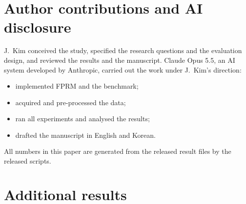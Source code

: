 \documentclass[11pt,a4paper]{article}
\newcommand{\tabdir}{../tables/en}
\begin{document}
\section*{Author contributions and AI disclosure}
J.\ Kim conceived the study, specified the research questions and the evaluation design, and reviewed the results and the manuscript.
Claude Opus 5.5, an AI system developed by Anthropic, carried out the work under J.\ Kim's direction:
\begin{itemize}
  \item implemented FPRM and the benchmark;
  \item acquired and pre-processed the data;
  \item ran all experiments and analysed the results;
  \item drafted the manuscript in English and Korean.
\end{itemize}
All numbers in this paper are generated from the released result files by the released scripts.




\clearpage
\appendix
\section{Additional results}

\begin{table}[h]
  \centering\small
  \caption{Median absolute error of total energy over removed daytime periods (\% of true energy). Bold: best per column.}
  \label{tab:energy}
  
\end{table}

\begin{table}[h]
  \centering\small
  \caption{Mean rank by dataset (all scenarios). Bold: best per column.}
  \label{tab:rank_ds}
  
\end{table}

\begin{table}[p]
  \centering\scriptsize
  \caption{Daytime RMSE (\%cap) for every scenario and parameter, averaged over datasets, seeds and incomplete series. Bold: best per row; ``div.'': numerical divergence (MICE in S4).}
  \label{tab:full}
  \resizebox{\linewidth}{!}{}
\end{table}
\end{document}
